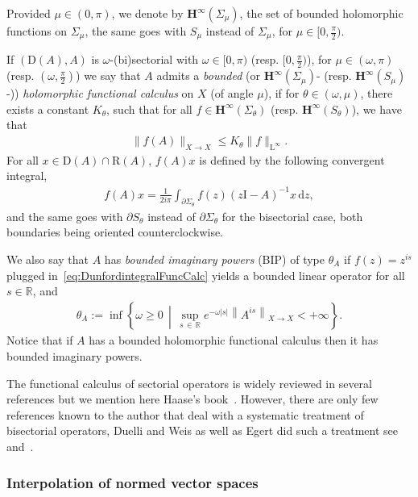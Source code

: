 \documentclass[AHL,Unicode,longabstracts,published]{cedram}
\newcommand{\bbR}{\mathbb{R}}
\newcommand{\rmd}{\mathrm{d}}
\newcommand{\rmD}{\mathrm{D}}
\newcommand{\rmL}{\mathrm{L}}
\newcommand{\rmR}{\mathrm{R}}
\newcommand{\rmI}{\mathrm{I}}
\newcommand{\bfH}{\mathbf{H}}
\begin{document}
Provided $\mu\in(0,\pi)$, we denote by $\bfH^\infty(\Sigma_\mu)$, the set of bounded holomorphic functions on $\Sigma_\mu$, the same goes with $S_\mu$ instead of $\Sigma_\mu$, for $\mu\in[0,\frac{\pi}{2})$.

If $(\rmD(A),A)$ is $\omega$-(bi)sectorial with $\omega\in[0,\pi)$ (resp. $[0,\frac{\pi}{2})$), for $\mu\in(\omega,\pi)$ (resp. $(\omega,\frac{\pi}{2})$) we say that $A$ admits a \emph{bounded} (or $\bfH^\infty(\Sigma_\mu)$- (resp. $\bfH^\infty(S_\mu)$-)) \emph{holomorphic functional calculus} on $X$ (of angle $\mu$), if for $\theta\in (\omega,\mu)$, there exists a constant $K_\theta$, such that for all $f\in\bfH^\infty(\Sigma_\theta)$ (resp. $\bfH^\infty(S_\theta)$), we have that
\begin{align*}
\| f(A)\|_{X\rightarrow X}\leqslant K_\theta \| f \|_{\rmL^\infty}.
\end{align*}
For all $x\in \rmD(A)\cap\rmR (A)$, $f(A)x$ is defined by the following convergent integral,
\begin{align}\label{eq:DunfordintegralFuncCalc}
f(A)x = \frac{1}{2 i \pi}\int_{\partial \Sigma_\theta} f(z)(z\rmI -A)^{-1}x\,\rmd z,
\end{align}
and the same goes with $\partial S_\theta$ instead of $\partial \Sigma_\theta$ for the bisectorial case, both boundaries being oriented counterclockwise.

We also say that $A$ has {\emph{bounded imaginary powers}} (BIP) of type $\theta_A$ if $f(z)=z^{is}$ plugged in~\eqref{eq:DunfordintegralFuncCalc} yields a bounded linear operator for all $s\in\bbR$, and
\begin{align*}
\theta_A:= \inf \left\{ \omega\geqslant 0\,\middle|\, \sup_{s\,\in\,\bbR} e^{-\omega|s|}\left\| A^{is}\right\|_{X \rightarrow X}<+\infty\right\}.
\end{align*}
Notice that if $A$ has a bounded holomorphic functional calculus then it has bounded imaginary powers.


The functional calculus of sectorial operators is widely reviewed in several references but we mention here Haase's book~\cite{bookHaase2006}. However, there are only few references known to the author that deal with a systematic treatment of bisectorial operators, Duelli and Weis as well as Egert did such a treatment see~\cite{DuelliWeis2004} and~\cite[Chapter~3]{EgertPhDThesis2015}.


\subsubsection{Interpolation of normed vector spaces}
\end{document}
